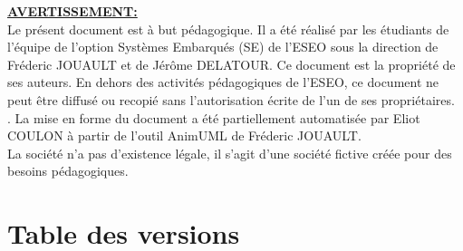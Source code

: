 \documentclass[a4paper,11pt,titlepage]{article}
\author{\teamName}        %
\title{\documentName}     %
\date{\normalsize\today}    %
\begin{document}
\maketitle

\setcounter{page}{1}
\vspace*{\fill}
\noindent
\underline{\textbf{AVERTISSEMENT:}} \\
Le présent document est à but pédagogique. Il a été réalisé par les étudiants {\teamMembers} de l'équipe {\teamNumber} de l'option Systèmes Embarqués (SE) de l’ESEO sous la direction de Fréderic JOUAULT et de Jérôme DELATOUR. Ce document est la propriété de ses auteurs. En dehors des activités pédagogiques de l'ESEO, ce document ne peut être diffusé ou recopié sans l’autorisation écrite de l'un de ses propriétaires. \\. La mise en forme du document a 
été partiellement automatisée par Eliot COULON à partir de l'outil AnimUML de Fréderic JOUAULT.\\ 
La société {\teamCompany} n’a pas d’existence légale, il s’agit d'une société fictive créée pour des besoins pédagogiques.
\vspace*{\fill}
\clearpage

\section*{Table des versions}
 \label{Table des versions} %
\clearpage

\tableofcontents %













\listoffigures \label{TableOfFigure} %
\end{document}
